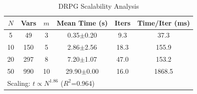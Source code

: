 \begin{table}[h]
\centering
\caption{DRPG Scalability Analysis}
\begin{tabular}{cccccc}
\hline
$N$ & Vars & $m$ & Mean Time (s) & Iters & Time/Iter (ms) \\
\hline
5 & 49 & 3 & 0.35$\pm$0.20 & 9.3 & 37.3 \\
10 & 150 & 5 & 2.86$\pm$2.56 & 18.3 & 155.9 \\
20 & 297 & 8 & 7.20$\pm$1.07 & 47.0 & 153.2 \\
50 & 990 & 10 & 29.90$\pm$0.00 & 16.0 & 1868.5 \\
\hline
\multicolumn{6}{l}{Scaling: $t \propto N^{1.86}$ ($R^2$=0.964)} \\
\end{tabular}
\end{table}